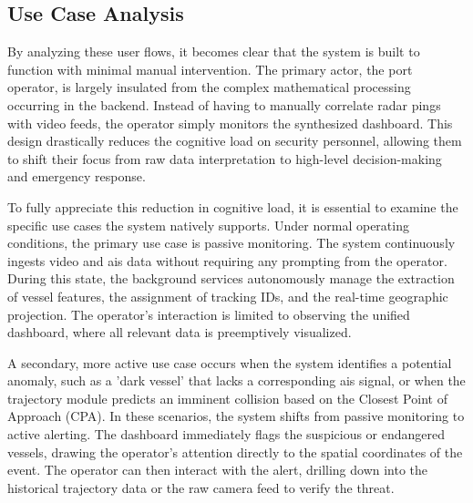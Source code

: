 \subsection{Use Case Analysis}
By analyzing these user flows, it becomes clear that the system is built to function with minimal manual intervention. The primary actor, the port operator, is largely insulated from the complex mathematical processing occurring in the backend. Instead of having to manually correlate radar pings with video feeds, the operator simply monitors the synthesized dashboard. This design drastically reduces the cognitive load on security personnel, allowing them to shift their focus from raw data interpretation to high-level decision-making and emergency response. 

To fully appreciate this reduction in cognitive load, it is essential to examine the specific use cases the system natively supports. Under normal operating conditions, the primary use case is passive monitoring. The system continuously ingests video and \gls{ais} data without requiring any prompting from the operator. During this state, the background services autonomously manage the extraction of vessel features, the assignment of tracking IDs, and the real-time geographic projection. The operator's interaction is limited to observing the unified dashboard, where all relevant data is preemptively visualized.

A secondary, more active use case occurs when the system identifies a potential anomaly, such as a 'dark vessel' that lacks a corresponding \gls{ais} signal, or when the trajectory module predicts an imminent collision based on the Closest Point of Approach (CPA). In these scenarios, the system shifts from passive monitoring to active alerting. The dashboard immediately flags the suspicious or endangered vessels, drawing the operator's attention directly to the spatial coordinates of the event. The operator can then interact with the alert, drilling down into the historical trajectory data or the raw camera feed to verify the threat.

